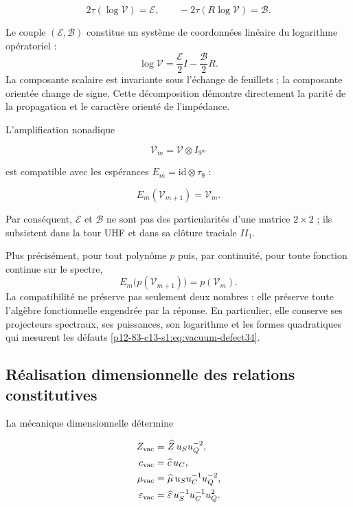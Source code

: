 \begin{equation}
2\tau(\log\mathcal V)=\mathcal E,
\qquad
-2\tau(R\log\mathcal V)=\mathcal B.
\label{p12-83-c13-s1:eq:vacuum-traces}
\end{equation}

Le couple \((\mathcal E,\mathcal B)\) constitue un système de coordonnées linéaire du logarithme
opératoriel :
\begin{equation}
\log\mathcal V
=\frac{\mathcal E}{2}I-\frac{\mathcal B}{2}R.
\label{p12-83-c13-s1:eq:vacuum-log-decomposition}
\end{equation}
La composante scalaire est invariante sous l'échange de feuillets ; la
composante orientée change de signe. Cette décomposition démontre
directement la parité de la propagation et le caractère orienté de
l'impédance.

L'amplification nonadique

\[
\mathcal V_m=\mathcal V\otimes I_{9^m}
\]

est compatible avec les espérances \(E_m=\mathrm{id}\otimes\tau_9\) :

\[
E_m(\mathcal V_{m+1})=\mathcal V_m.
\]

Par conséquent, \(\mathcal E\) et \(\mathcal B\) ne sont pas des particularités d'une matrice \(2\times2\) ; ils subsistent dans la tour UHF et dans sa clôture traciale \(II_1\).

Plus précisément, pour tout polynôme \(p\) puis, par continuité,
pour toute fonction continue sur le spectre,
\begin{equation}
E_m\bigl(p(\mathcal V_{m+1})\bigr)=p(\mathcal V_m).
\label{p12-83-c13-s1:eq:vacuum-functional-refinement}
\end{equation}
La compatibilité ne préserve pas seulement deux nombres : elle préserve toute
l'algèbre fonctionnelle engendrée par la réponse. En particulier, elle conserve ses
projecteurs spectraux, ses puissances, son logarithme et les formes quadratiques
qui mesurent les défauts \cref{p12-83-c13-s1:eq:vacuum-defect34}.

\subsection{Réalisation dimensionnelle des relations constitutives}

La mécanique dimensionnelle détermine

\begin{align}
Z_{\rm vac}&=\widehat Z\,u_Su_Q^{-2},\\
c_{\rm vac}&=\widehat c\,u_C,\\
\mu_{\rm vac}&=\widehat\mu\,u_Su_C^{-1}u_Q^{-2},\\
\varepsilon_{\rm vac}&=\widehat\varepsilon\,u_S^{-1}u_C^{-1}u_Q^2.
\label{p12-83-c13-s1:eq:vacuum-sections}
\end{align}

